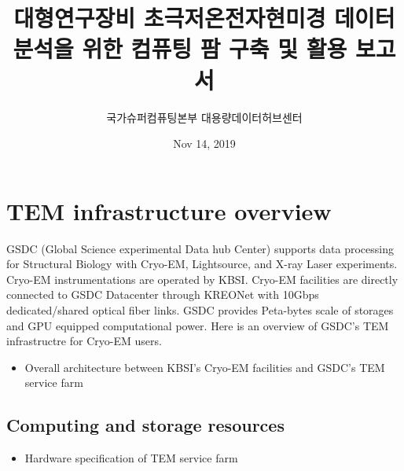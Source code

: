 \documentclass[letterpaper,10pt,english]{sphinxmanual}
\title{대형연구장비 초극저온전자현미경 데이터 분석을 위한 컴퓨팅 팜 구축 및 활용 보고서}
\date{Nov 14, 2019}
\author{국가슈퍼컴퓨팅본부 대용량데이터허브센터}
\begin{document}
\pagestyle{empty}
\sphinxmaketitle
\pagestyle{plain}
\sphinxtableofcontents
\pagestyle{normal}
\label{\detokenize{index::doc}}



\chapter{TEM infrastructure overview}
\label{\detokenize{infra:tem-infrastructure-overview}}\label{\detokenize{infra::doc}}
GSDC (Global Science experimental Data hub Center) supports data processing for Structural Biology with Cryo-EM, Lightsource, and X-ray Laser experiments.
Cryo-EM instrumentations are operated by KBSI. Cryo-EM facilities are directly connected to GSDC Datacenter through KREONet with 10Gbps dedicated/shared optical fiber links. GSDC provides Peta-bytes scale of storages and GPU equipped computational power. Here is an overview of GSDC’s TEM infrastructre for Cryo-EM users.
\begin{itemize}
\item {} 
Overall architecture between KBSI’s Cryo-EM facilities and GSDC’s TEM service farm

\end{itemize}



\section{Computing and storage resources}
\label{\detokenize{infra:computing-and-storage-resources}}\begin{itemize}
\item {} 
Hardware specification of TEM service farm

\end{itemize}
\end{document}
